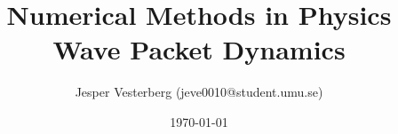 \title{Numerical Methods in Physics \\ Wave Packet Dynamics}
\author{Jesper Vesterberg (jeve0010@student.umu.se)}
\date{\today}

\begin{titlepage}
  \maketitle
  \thispagestyle{fancy}
  \rhead{\today}

\end{titlepage}
